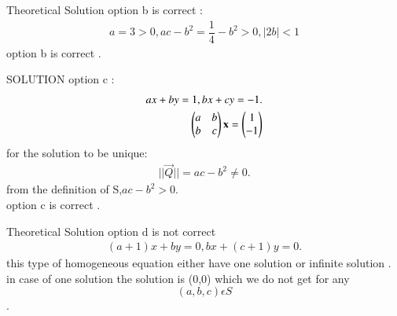 \documentclass{beamer}
\begin{document}
\begin{frame}{Theoretical Solution}
option b is correct :
\\
\begin{align*}
    a=3>0,ac-b^2=\dfrac{1}{4}-b^2>0,|2b|<1
\end{align*}
option b  is correct .
\end{frame}
\begin{frame}{SOLUTION}
 option c :
\\
\begin{align*}
    ax+by=1,bx+cy=-1.
    \\
    \begin{pmatrix}a&b\\b&c\end{pmatrix}\mathbf{x}=\begin{pmatrix}1\\-1\end{pmatrix}
\end{align*}
for the solution to be unique:
\\
\begin{align*}
    ||\vec{Q}||=ac-b^2\neq0.
\end{align*}
from the definition of S,$ac-b^2>0$.
\\
option c is correct .
\end{frame}
\begin{frame}{Theoretical Solution}
 option d is not correct 
\\
\begin{align*}
    (a+1)x+by=0,bx+(c+1)y=0.
\end{align*}
this type of homogeneous equation either have one solution or infinite solution .
\\
in case of one solution the solution is (0,0) which we do not get for any $$(a,b,c)\epsilon S$$.
\end{frame}
\end{document}
